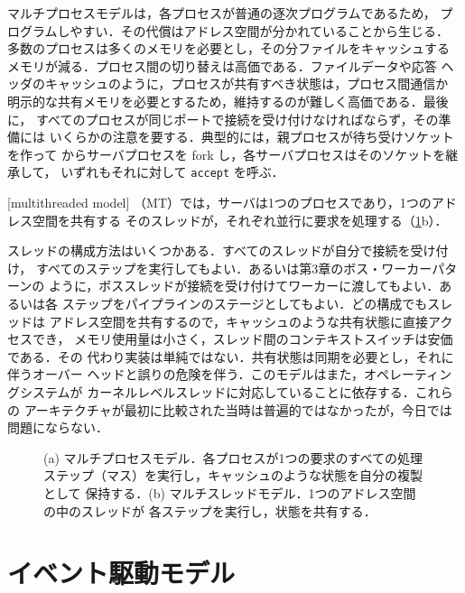 \documentclass[../main.tex]{subfiles}
\begin{document}
マルチプロセスモデルは，各プロセスが普通の逐次プログラムであるため，
プログラムしやすい．その代償はアドレス空間が分かれていることから生じる．
多数のプロセスは多くのメモリを必要とし，その分ファイルをキャッシュする
メモリが減る．プロセス間の切り替えは高価である．ファイルデータや応答
ヘッダのキャッシュのように，プロセスが共有すべき状態は，プロセス間通信か
明示的な共有メモリを必要とするため，維持するのが難しく高価である．最後に，
すべてのプロセスが同じポートで接続を受け付けなければならず，その準備には
いくらかの注意を要する．典型的には，親プロセスが待ち受けソケットを作って
からサーバプロセスを fork し，各サーバプロセスはそのソケットを継承して，
いずれもそれに対して \texttt{accept} を呼ぶ．

\begin{definition}[マルチスレッドモデル]
  [multithreaded model]%
  （MT）では，サーバは1つのプロセスであり，1つのアドレス空間を共有する
  そのスレッドが，それぞれ並行に要求を処理する（\cref{fig:l06-mp-mt}b）．
\end{definition}

スレッドの構成方法はいくつかある．すべてのスレッドが自分で接続を受け付け，
すべてのステップを実行してもよい．あるいは第3章のボス・ワーカーパターンの
ように，ボススレッドが接続を受け付けてワーカーに渡してもよい．あるいは各
ステップをパイプラインのステージとしてもよい．どの構成でもスレッドは
アドレス空間を共有するので，キャッシュのような共有状態に直接アクセスでき，
メモリ使用量は小さく，スレッド間のコンテキストスイッチは安価である．その
代わり実装は単純ではない．共有状態は同期を必要とし，それに伴うオーバー
ヘッドと誤りの危険を伴う．このモデルはまた，オペレーティングシステムが
カーネルレベルスレッドに対応していることに依存する．これらの
アーキテクチャが最初に比較された当時は普遍的ではなかったが，今日では
問題にならない．

\begin{figure}[htbp]
  \centering
  
  \caption{(a) マルチプロセスモデル．各プロセスが1つの要求のすべての処理
    ステップ（マス）を実行し，キャッシュのような状態を自分の複製として
    保持する．(b) マルチスレッドモデル．1つのアドレス空間の中のスレッドが
    各ステップを実行し，状態を共有する．}
  \label{fig:l06-mp-mt}
\end{figure}

\section{イベント駆動モデル}
\label{sec:l06-event}
\end{document}
